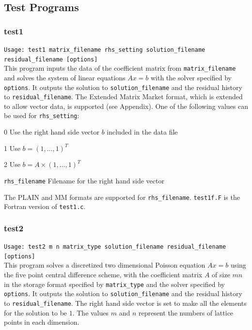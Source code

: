 \documentclass[a4paper]{article}
\newcommand{\namelistlabel}[1]{\mbox{#1}\hfill}
\newenvironment{namelist}[1]{%
 \begin{list}{}
  {\let\makelabel\namelistlabel
  \settowidth{\labelwidth}{#1}
  \setlength{\leftmargin}{1.1\labelwidth}}
}{%
\end{list}}
\begin{document}
\newpage
\subsection{Test Programs}
\subsubsection{test1}

\verb+Usage: test1 matrix_filename rhs_setting solution_filename residual_filename [options]+\\

This program inputs the data of the coefficient matrix from {\tt matrix\_filename} and solves the system of linear equations $Ax=b$ with 
the solver specified by {\tt options}. 
It outputs the solution to 
{\tt solution\_filename} and the residual history to {\tt residual\_filename}. 
The Extended Matrix Market format, which is extended to allow vector
data, is supported (see Appendix). 
One of the following values can be used for {\tt rhs\_setting}:
\begin{namelist}{XXXXXXXXXXXXXXXXXXXX}
\item[0] Use the right hand side vector $b$ included in the data file
\item[1] Use $b = (1,\dots,1)^T$
\item[2] Use $b = A \times (1,\dots,1)^T$
\item[\tt rhs\_filename] Filename for the right hand side vector 
\end{namelist}
The PLAIN and MM formats are supported for {\tt rhs\_filename}. 
{\tt test1f.F} is the Fortran version of {\tt test1.c}.

\subsubsection{test2}

\verb+Usage: test2 m n matrix_type solution_filename residual_filename [options]+\\

This program solves a discretized two dimensional 
Poisson equation $Ax = b$ using the five
point central difference scheme, with the coefficient matrix $A$ 
of size $mn$ in the storage format specified
by \verb|matrix_type| and the solver specified by {\tt options}. 
It outputs the solution to {\tt solution\_filename} and 
the residual history to {\tt residual\_filename}. 
The right hand side vector is set to make all the elements for the solution to be $1$. 
The values $m$ and $n$ represent the numbers of lattice points
in each dimension. 
\end{document}
